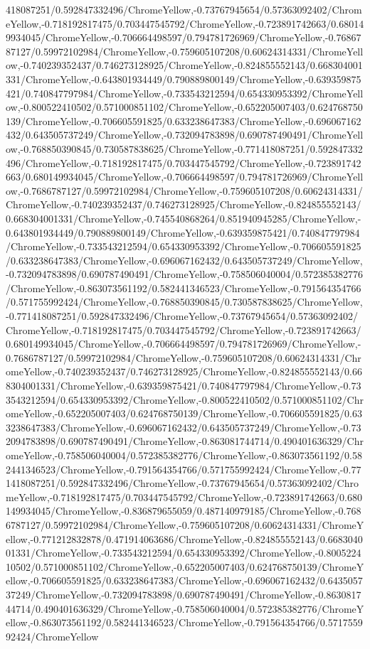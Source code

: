 {\begin{tikzternal}
{418087251/0.592847332496/ChromeYellow,-0.73767945654/0.57363092402/ChromeYellow,-0.718192817475/0.703447545792/ChromeYellow,-0.723891742663/0.680149934045/ChromeYellow,-0.706664498597/0.794781726969/ChromeYellow,-0.7686787127/0.59972102984/ChromeYellow,-0.759605107208/0.60624314331/ChromeYellow,-0.740239352437/0.746273128925/ChromeYellow,-0.824855552143/0.668304001331/ChromeYellow,-0.643801934449/0.790889800149/ChromeYellow,-0.639359875421/0.740847797984/ChromeYellow,-0.733543212594/0.654330953392/ChromeYellow,-0.800522410502/0.571000851102/ChromeYellow,-0.652205007403/0.624768750139/ChromeYellow,-0.706605591825/0.633238647383/ChromeYellow,-0.696067162432/0.643505737249/ChromeYellow,-0.732094783898/0.690787490491/ChromeYellow,-0.768850390845/0.730587838625/ChromeYellow,-0.771418087251/0.592847332496/ChromeYellow,-0.718192817475/0.703447545792/ChromeYellow,-0.723891742663/0.680149934045/ChromeYellow,-0.706664498597/0.794781726969/ChromeYellow,-0.7686787127/0.59972102984/ChromeYellow,-0.759605107208/0.60624314331/ChromeYellow,-0.740239352437/0.746273128925/ChromeYellow,-0.824855552143/0.668304001331/ChromeYellow,-0.745540868264/0.851940945285/ChromeYellow,-0.643801934449/0.790889800149/ChromeYellow,-0.639359875421/0.740847797984/ChromeYellow,-0.733543212594/0.654330953392/ChromeYellow,-0.706605591825/0.633238647383/ChromeYellow,-0.696067162432/0.643505737249/ChromeYellow,-0.732094783898/0.690787490491/ChromeYellow,-0.758506040004/0.572385382776/ChromeYellow,-0.863073561192/0.582441346523/ChromeYellow,-0.791564354766/0.571755992424/ChromeYellow,-0.768850390845/0.730587838625/ChromeYellow,-0.771418087251/0.592847332496/ChromeYellow,-0.73767945654/0.57363092402/ChromeYellow,-0.718192817475/0.703447545792/ChromeYellow,-0.723891742663/0.680149934045/ChromeYellow,-0.706664498597/0.794781726969/ChromeYellow,-0.7686787127/0.59972102984/ChromeYellow,-0.759605107208/0.60624314331/ChromeYellow,-0.740239352437/0.746273128925/ChromeYellow,-0.824855552143/0.668304001331/ChromeYellow,-0.639359875421/0.740847797984/ChromeYellow,-0.733543212594/0.654330953392/ChromeYellow,-0.800522410502/0.571000851102/ChromeYellow,-0.652205007403/0.624768750139/ChromeYellow,-0.706605591825/0.633238647383/ChromeYellow,-0.696067162432/0.643505737249/ChromeYellow,-0.732094783898/0.690787490491/ChromeYellow,-0.863081744714/0.490401636329/ChromeYellow,-0.758506040004/0.572385382776/ChromeYellow,-0.863073561192/0.582441346523/ChromeYellow,-0.791564354766/0.571755992424/ChromeYellow,-0.771418087251/0.592847332496/ChromeYellow,-0.73767945654/0.57363092402/ChromeYellow,-0.718192817475/0.703447545792/ChromeYellow,-0.723891742663/0.680149934045/ChromeYellow,-0.836879655059/0.487140979185/ChromeYellow,-0.7686787127/0.59972102984/ChromeYellow,-0.759605107208/0.60624314331/ChromeYellow,-0.771212832878/0.471914063686/ChromeYellow,-0.824855552143/0.668304001331/ChromeYellow,-0.733543212594/0.654330953392/ChromeYellow,-0.800522410502/0.571000851102/ChromeYellow,-0.652205007403/0.624768750139/ChromeYellow,-0.706605591825/0.633238647383/ChromeYellow,-0.696067162432/0.643505737249/ChromeYellow,-0.732094783898/0.690787490491/ChromeYellow,-0.863081744714/0.490401636329/ChromeYellow,-0.758506040004/0.572385382776/ChromeYellow,-0.863073561192/0.582441346523/ChromeYellow,-0.791564354766/0.571755992424/ChromeYellow}
\end{tikzternal}}
